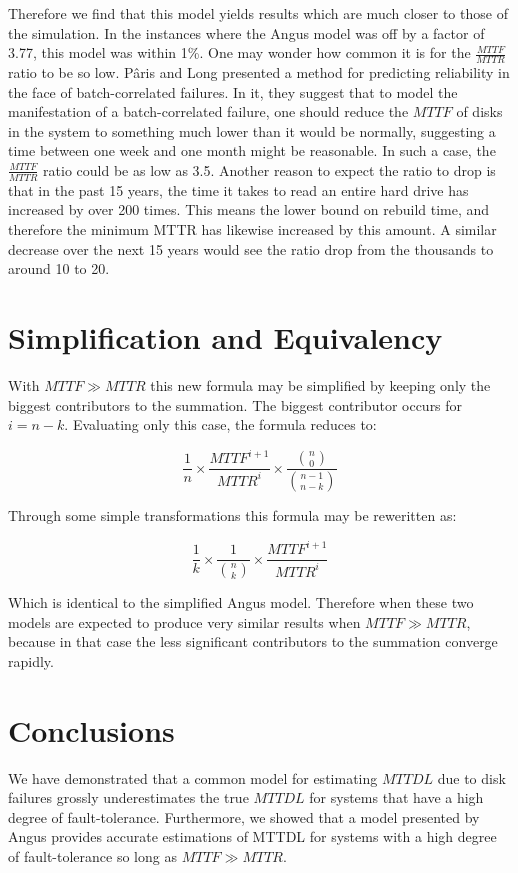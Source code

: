 \documentclass[XXX,endnotes]{usetex-v1}
\begin{document}
Therefore we find that this model yields results which are much closer to those of the simulation.  In the instances where the Angus model was off by a factor of 3.77, this model was within 1\%.  One may wonder how common it is for the $\frac{MTTF}{MTTR}$ ratio to be so low.  P\^aris and Long presented a method for predicting reliability in the face of batch-correlated failures\cite{correlations}.  In it, they suggest that to model the manifestation of a batch-correlated failure, one should reduce the $MTTF$ of disks in the system to something much lower than it would be normally, suggesting a time between one week and one month might be reasonable.  In such a case, the $\frac{MTTF}{MTTR}$ ratio could be as low as 3.5.  Another reason to expect the ratio to drop is that in the past 15 years, the time it takes to read an entire hard drive has increased by over 200 times.  This means the lower bound on rebuild time, and therefore the minimum MTTR has likewise increased by this amount.  A similar decrease over the next 15 years would see the ratio drop from the thousands to around 10 to 20.

\section{Simplification and Equivalency}

With $MTTF \gg MTTR$ this new formula may be simplified by keeping only the biggest contributors to the summation.  The biggest contributor occurs for $i = n - k$.  Evaluating only this case, the formula reduces to:

$$\frac{1}{n} \times \frac{MTTF^{i+1}}{MTTR^{i}} \times \frac{{{n}\choose{0}}}{{{n-1}\choose{n-k}}}$$ 

Through some simple transformations this formula may be reweritten as:

$$\frac{1}{k} \times \frac{1}{{{n}\choose{k}}} \times \frac{MTTF^{i+1}}{MTTR^{i}}$$

Which is identical to the simplified Angus model.  Therefore when these two models are expected to produce very similar results when $MTTF \gg MTTR$, because in that case the less significant contributors to the summation converge rapidly.

\section{Conclusions}

We have demonstrated that a common model for estimating $MTTDL$ due to disk failures grossly underestimates the true $MTTDL$ for systems that have a high degree of fault-tolerance.  Furthermore, we showed that a model presented by Angus provides accurate estimations of MTTDL for systems with a high degree of fault-tolerance so long as $MTTF \gg MTTR$.
\end{document}
